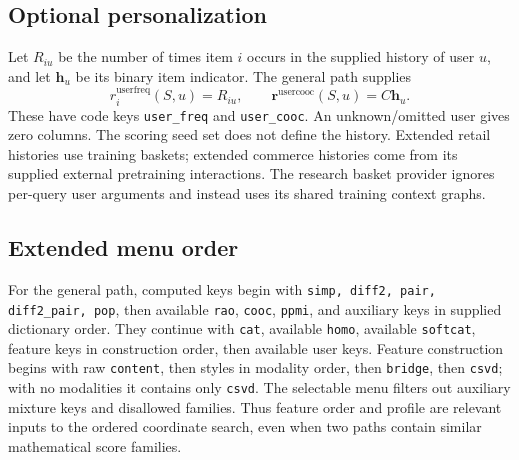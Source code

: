 \documentclass[11pt,a4paper]{article}
\newcommand{\code}[1]{\nolinkurl{#1}}
\newcommand{\sig}[1]{\mathrm{#1}}
\numberwithin{equation}{section}
\begin{document}
\subsection{Optional personalization}
Let $R_{iu}$ be the number of times item $i$ occurs in the supplied history of user $u$,
and let $\bm h_u$ be its binary item indicator. The general path supplies
\begin{equation}
 r^{\sig{userfreq}}_i(S,u)=R_{iu},\qquad
 \bm r^{\sig{usercooc}}(S,u)=C\bm h_u.
\end{equation}
These have code keys \code{user_freq} and \code{user_cooc}. An unknown/omitted user gives
zero columns. The scoring seed set does not define the history. Extended retail histories
use training baskets; extended commerce histories come from its supplied external
pretraining interactions. The research basket provider ignores per-query user arguments
and instead uses its shared training context graphs.

\subsection{Extended menu order}
For the general path, computed keys begin with \code{simp, diff2, pair, diff2_pair, pop},
then available \code{rao}, \code{cooc}, \code{ppmi}, and auxiliary keys in supplied dictionary
order. They continue with \code{cat}, available \code{homo}, available \code{softcat},
feature keys in construction order, then available user keys. Feature construction begins
with raw \code{content}, then styles in modality order, then \code{bridge}, then
\code{csvd}; with no modalities it contains only \code{csvd}. The selectable menu filters
out auxiliary mixture keys and disallowed families. Thus feature order and profile are
relevant inputs to the ordered coordinate search, even when two paths contain similar
mathematical score families.
\end{document}
